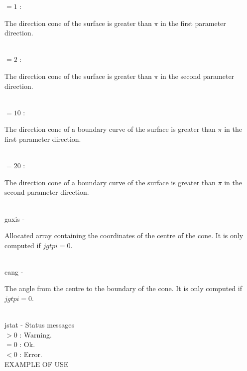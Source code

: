                 \>\>\>\> $=1$ \> :
                \begin{minipg5}
                  The direction cone of the surface
                  is greater than $\pi$ in the first parameter direction.
                \end{minipg5}\\[0.8ex]
                \>\>\>\> $=2$ \> :
                \begin{minipg5}
                  The direction cone of the surface is greater
                  than $\pi$ in the second parameter direction.
                \end{minipg5}\\[0.8ex]
                \>\>\>\> $=10$ \> :
                \begin{minipg5}
                  The direction cone of a boundary curve of
                  the surface is greater than $\pi$ in the first
                  parameter direction.
                \end{minipg5}\\[0.8ex]
                \>\>\>\> $=20$ \> :
                \begin{minipg5}
                  The direction cone of a boundary curve of
                  the surface is greater than $\pi$ in the second
                  parameter direction.
                \end{minipg5}\\[0.8ex]
        \>\>    {\fov gaxis}\> - \>
        \begin{minipg2}
          Allocated array containing the coordinates of the
          centre of the cone. It is only computed if $jgtpi=0$.
        \end{minipg2}\\[0.8ex]
        \>\>    {\fov cang}\> - \>
        \begin{minipg2}
          The angle from the centre to the boundary of the
          cone. It is only computed if $jgtpi=0$.
        \end{minipg2}\\[0.8ex]
        \>\>    {\fov jstat}     \> - \> Status messages\\
                \>\>\>\>              $> 0$ \> : Warning.\\
                \>\>\>\>              $= 0$ \> : Ok.\\
                \>\>\>\>              $< 0$ \> : Error.\\
\newpagetabs
EXAMPLE OF USE\\

